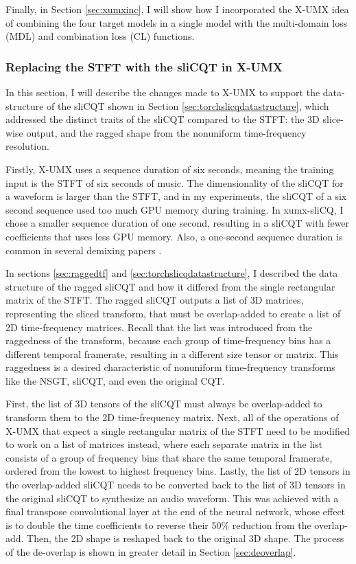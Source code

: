\documentclass[report.tex]{subfiles}
\begin{document}
Finally, in Section \ref{sec:xumxinc}, I will show how I incorporated the X-UMX idea of combining the four target models in a single model with the multi-domain loss (MDL) and combination loss (CL) functions.

\subsubsection{Replacing the STFT with the sliCQT in X-UMX}
\label{sec:replacestft}

In this section, I will describe the changes made to X-UMX to support the data-structure of the sliCQT shown in Section \ref{sec:torchslicqdatastructure}, which addressed the distinct traits of the sliCQT compared to the STFT: the 3D slice-wise output, and the ragged shape from the nonuniform time-frequency resolution.

Firstly, X-UMX uses a sequence duration of six seconds, meaning the training input is the STFT of six seconds of music. The dimensionality of the sliCQT for a waveform is larger than the STFT, and in my experiments, the sliCQT of a six second sequence used too much GPU memory during training. In xumx-sliCQ, I chose a smaller sequence duration of one second, resulting in a sliCQT with fewer coefficients that uses less GPU memory. Also, a one-second sequence duration is common in several demixing papers \parencite{plumbley1, plumbley2, demucs}.

In sections \ref{sec:raggedtf} and \ref{sec:torchslicqdatastructure}, I described the data structure of the ragged sliCQT and how it differed from the single rectangular matrix of the STFT. The ragged sliCQT outputs a list of 3D matrices, representing the sliced transform, that must be overlap-added to create a list of 2D time-frequency matrices. Recall that the list was introduced from the raggedness of the transform, because each group of time-frequency bins has a different temporal framerate, resulting in a different size tensor or matrix. This raggedness is a desired characteristic of nonuniform time-frequency transforms like the NSGT, sliCQT, and even the original CQT.

First, the list of 3D tensors of the sliCQT must always be overlap-added to transform them to the 2D time-frequency matrix. Next, all of the operations of X-UMX that expect a single rectangular matrix of the STFT need to be modified to work on a list of matrices instead, where each separate matrix in the list consists of a group of frequency bins that share the same temporal framerate, ordered from the lowest to highest frequency bins. Lastly, the list of 2D tensors in the overlap-added sliCQT needs to be converted back to the list of 3D tensors in the original sliCQT to synthesize an audio waveform. This was achieved with a final transpose convolutional layer at the end of the neural network, whose effect is to double the time coefficients to reverse their 50\% reduction from the overlap-add. Then, the 2D shape is reshaped back to the original 3D shape. The process of the de-overlap is shown in greater detail in Section \ref{sec:deoverlap}.
\end{document}
